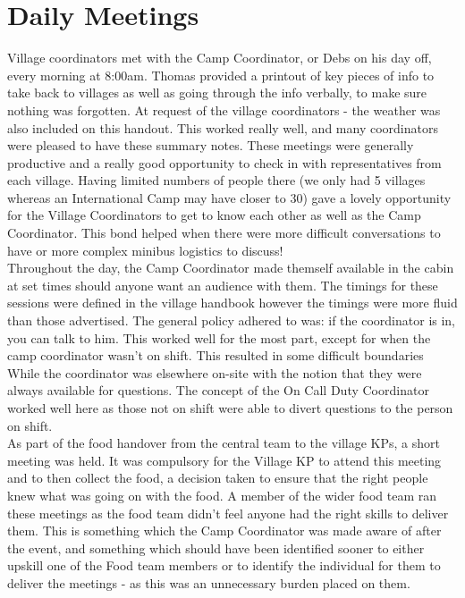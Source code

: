\section{Daily Meetings}
Village coordinators met with the Camp Coordinator, or Debs on his day off, every morning at 8:00am.  Thomas provided a printout of key pieces of info to take back to villages as well as going through the info verbally, to make sure nothing was forgotten. At request of the village coordinators - the weather was also included on this handout. This worked really well, and many coordinators were pleased to have these summary notes. 
These meetings were generally productive and a really good opportunity to check in with representatives from each village. Having limited numbers of people there (we only had 5 villages whereas an International Camp may have closer to 30) gave a lovely opportunity for the Village Coordinators to get to know each other as well as the Camp Coordinator. This bond helped when there were more difficult conversations to have or more complex minibus logistics to discuss!\\

Throughout the day, the Camp Coordinator made themself available in the cabin at set times should anyone want an audience with them. The timings for these sessions were defined in the village handbook however the timings were more fluid than those advertised. The general policy adhered to was: if the coordinator is in, you can talk to him. This worked well for the most part, except for when the camp coordinator wasn't on shift. This resulted in some difficult boundaries 
While the coordinator was elsewhere on-site with the notion that they were always available for questions. The concept of the On Call Duty Coordinator worked well here as those not on shift were able to divert questions to the person on shift.\\

As part of the food handover from the central team to the village KPs, a short meeting was held. It was compulsory for the Village KP to attend this meeting and to then collect the food, a decision taken to ensure that the right people knew what was going on with the food. A member of the wider food team ran these meetings as the food team didn't feel anyone had the right skills to deliver them. This is something which the Camp Coordinator was made aware of after the event, and something which should have been identified sooner to either upskill one of the Food team members or to identify the individual for them to deliver the meetings - as this was an unnecessary burden placed on them. 

